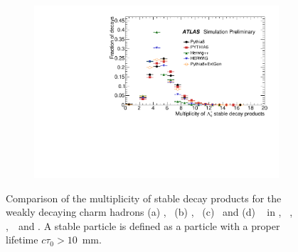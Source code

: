 \begin{figure}
\begin{subfigure}[]{0.45\textwidth}
\end{subfigure}
\begin{subfigure}[]{0.45\textwidth}
\includegraphics[width=\textwidth]{evtgen/figures/EvtGen/Lambdac+/h_species_multiplicity.pdf}
\end{subfigure}
\caption{Comparison of the multiplicity of stable decay products for the weakly decaying 
charm hadrons 
(a) \Dzero,~ (b) \Dplus,~ (c) \Ds\ and (d) \Lc~ in \PythiaE,~ \Pythia,~ \Herwigpp,~\Herwig\ and \EvtGen.
A stable particle is defined
as a particle with a proper lifetime $c\tau_{0}>10$~mm. }
\label{fig:cmult}
\end{figure}





